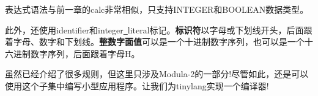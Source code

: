 表达式语法与前一章的calc非常相似，只支持INTEGER和BOOLEAN数据类型。\par

此外，还使用identifier和integer\underline{~}literal标记。\textbf{标识符}以字母或下划线开头，后面跟着字母、数字和下划线。\textbf{整数字面值}可以是一个十进制数字序列，也可以是一个十六进制数字序列，后面跟着字母H。\par

虽然已经介绍了很多规则，但这里只涉及Modula-2的一部分!尽管如此，还是可以使用这个子集中编写小型应用程序。让我们为tinylang实现一个编译器!\par



















